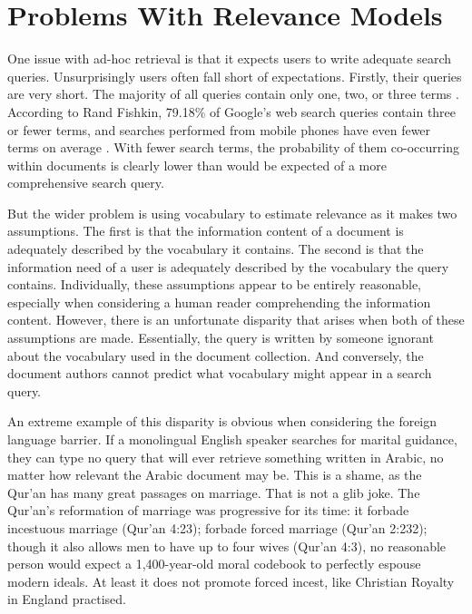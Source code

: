 \section{Problems With Relevance Models}\label{problems-with-relevance-models}
One issue with ad-hoc retrieval is that it expects users to write adequate search queries. Unsurprisingly users often fall short of expectations. Firstly, their queries are very short. The majority of all queries contain only one, two, or three terms \cite{gabrilovich2009classifying}. According to Rand Fishkin, 79.18\% of Google's web search queries contain three or fewer terms, and searches performed from mobile phones have even fewer terms on average \cite{enge2012art}. With fewer search terms, the probability of them co-occurring within documents is clearly lower than would be expected of a more comprehensive search query.

But the wider problem is using vocabulary to estimate relevance as it makes two assumptions. The first is that the information content of a document is adequately described by the vocabulary it contains. The second is that the information need of a user is adequately described by the vocabulary the query contains. Individually, these assumptions appear to be entirely reasonable, especially when considering a human reader comprehending the information content. However, there is an unfortunate disparity that arises when both of these assumptions are made. Essentially, the query is written by someone ignorant about the vocabulary used in the document collection. And conversely, the document authors cannot predict what vocabulary might appear in a search query.

An extreme example of this disparity is obvious when considering the foreign language barrier. If a monolingual English speaker searches for marital guidance, they can type no query that will ever retrieve something written in Arabic, no matter how relevant the Arabic document may be. This is a shame, as the Qur'an has many great passages on marriage. That is not a glib joke. The Qur'an's reformation of marriage was progressive for its time: it forbade incestuous marriage (Qur'an 4:23); forbade forced marriage (Qur'an 2:232); though it also allows men to have up to four wives (Qur'an 4:3), no reasonable person would expect a 1,400-year-old moral codebook to perfectly espouse modern ideals. At least it does not promote forced incest, like Christian Royalty in England practised.


